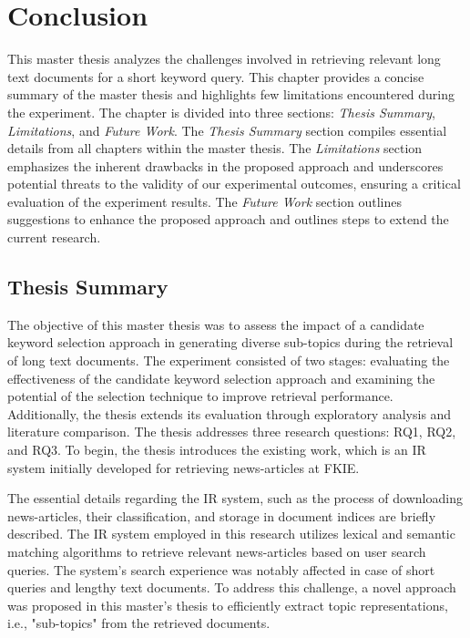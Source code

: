 
\chapter{Conclusion}

This master thesis analyzes the challenges involved in retrieving relevant long text documents for a short keyword query. This chapter provides a concise summary of the master thesis and highlights few limitations encountered during the experiment. The chapter is divided into three sections: \emph{Thesis Summary}, \emph{Limitations}, and \emph{Future Work}. The \emph{Thesis Summary} section compiles essential details from all chapters within the master thesis. The \emph{Limitations} section emphasizes the inherent drawbacks in the proposed approach and underscores potential threats to the validity of our experimental outcomes, ensuring a critical evaluation of the experiment results. The \emph{Future Work} section outlines suggestions to enhance the proposed approach and outlines steps to extend the current research.

\section{Thesis Summary}

The objective of this master thesis was to assess the impact of a candidate keyword selection approach in generating diverse sub-topics during the retrieval of long text documents. The experiment consisted of two stages: evaluating the effectiveness of the candidate keyword selection approach and examining the potential of the selection technique to improve retrieval performance. Additionally, the thesis extends its evaluation through exploratory analysis and literature comparison. The thesis addresses three research questions: RQ1, RQ2, and RQ3. To begin, the thesis introduces the existing work, which is an \ac{IR} system initially developed for retrieving news-articles at \ac{FKIE}. 

The essential details regarding the \ac{IR} system, such as the process of downloading news-articles, their classification, and storage in document indices are briefly described. The \ac{IR} system employed in this research utilizes lexical and semantic matching algorithms to retrieve relevant news-articles based on user search queries. The system's search experience was notably affected in case of short queries and lengthy text documents. To address this challenge, a novel approach was proposed in this master's thesis to efficiently extract topic representations, i.e., "sub-topics" from the retrieved documents.

